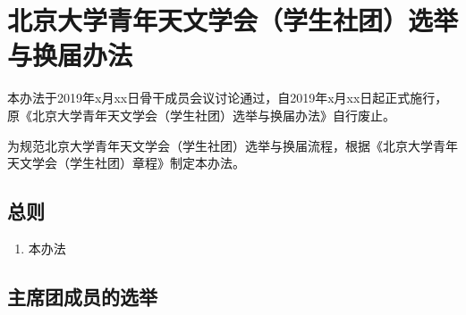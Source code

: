 \chapter{北京大学青年天文学会（学生社团）选举与换届办法}

本办法于2019年x月xx日骨干成员会议讨论通过，自2019年x月xx日起正式施行，原《北京大学青年天文学会（学生社团）选举与换届办法》自行废止。

为规范北京大学青年天文学会（学生社团）选举与换届流程，根据《北京大学青年天文学会（学生社团）章程》制定本办法。

\section{总则}

\begin{enumerate}
    \item 本办法
\end{enumerate}

\section{主席团成员的选举}

